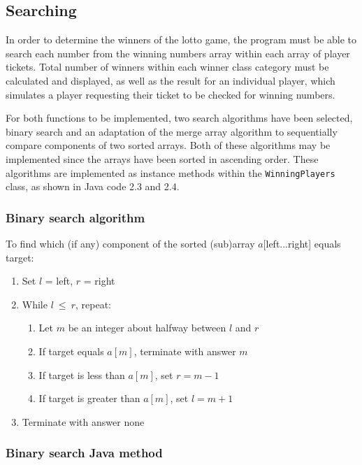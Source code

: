\newpage
\subsection{Searching}

In order to determine the winners of the lotto game, the program must be able to search each number from the winning numbers array within each array of player tickets. Total number of winners within each winner class category must be calculated and displayed, as well as the result for an individual player, which simulates a player requesting their ticket to be checked for winning numbers.

For both functions to be implemented, two search algorithms have been selected, binary search and an adaptation of the merge array algorithm to sequentially compare components of two sorted arrays. Both of these algorithms may be implemented since the arrays have been sorted in ascending order. These algorithms are implemented as instance methods within the \texttt{WinningPlayers} class, as shown in Java code 2.3 and 2.4.

\subsubsection{Binary search algorithm}

To find which (if any) component of the sorted (sub)array $a$[left...right] equals target:

\begin{enumerate}
\item Set $l$ = left, $r$ = right
\item While $l \ \leq \ r$, repeat:
	\begin{enumerate}
	\item Let $m$ be an integer about halfway between $l$ and $r$
	\item If target equals $a[m]$, terminate with answer $m$
	\item If target is less than $a[m]$, set $r = m - 1$
	\item If target is greater than $a[m]$, set $l = m + 1$
	\end{enumerate}
\item Terminate with answer none
\end{enumerate}

\noindent
\citep[p. 43]{Watt2001}

\subsubsection{Binary search Java method}

